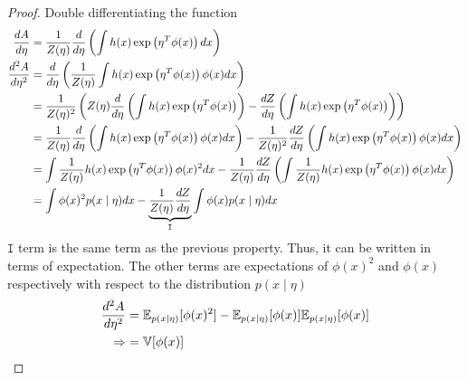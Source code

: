 \documentclass{homework}
\begin{document}
\begin{proof}
Double differentiating the function 
\begin{align*}
{d A \over d\eta} &= {1\over Z(\eta)} {d \over d \eta} \left(\int h(x) \exp\left(\eta^T \phi (x)\right) dx\right)\\ 
{d^2 A \over d\eta^2} &= {d\over d\eta}\left({1\over Z(\eta)} \int h(x) \exp\left(\eta^T \phi (x)\right) \phi(x) dx\right)\\ 
&= {1\over Z(\eta)^2}\left(Z(\eta) {d\over d\eta} \left(\int h(x) \exp\left(\eta^T \phi (x)\right)\right) - {d Z\over d \eta}\left(\int h(x) \exp\left(\eta^T \phi (x)\right)\right)\right)\\
&= {1\over Z(\eta)} {d\over d\eta} \left(\int h(x) \exp\left(\eta^T \phi (x)\right)\phi (x) dx\right) - {1\over Z(\eta)^2}{d Z\over d \eta}\left(\int h(x) \exp\left(\eta^T \phi (x)\right)\phi (x) dx\right)\\
&=  \int {1\over Z(\eta)}h(x) \exp\left(\eta^T \phi (x)\right)\phi(x)^2 dx - {1\over Z(\eta)}{d Z\over d \eta}\left(\int {1\over Z(\eta)}h(x) \exp\left(\eta^T \phi (x)\right)\phi (x) dx\right)\\
&= \int \phi(x)^2 p(x\mid \eta)dx - \underbrace{{1\over Z(\eta)}{d Z \over d \eta}}_{\mathtt{I}}\int \phi(x) p(x\mid \eta) dx \\
\end{align*}
$\mathtt{I}$ term is the same term as the previous property. Thus, it can be written in terms of expectation. The other terms are expectations of $\phi(x)^2$ and $\phi(x)$ respectively with respect to the distribution $p(x\mid \eta)$
$$
\begin{aligned}
{d^2 A \over d\eta^2} &= \mathbb{E}_{p(x\mid \eta)}[\phi (x)^2] - \mathbb{E}_{p(x\mid \eta)}[\phi (x)]\mathbb{E}_{p(x\mid \eta)}[\phi (x)] \\ 
\Rightarrow  &= {\mathbb {V}}[\phi(x)]
\end{aligned}
$$

\end{proof}
\end{document}
